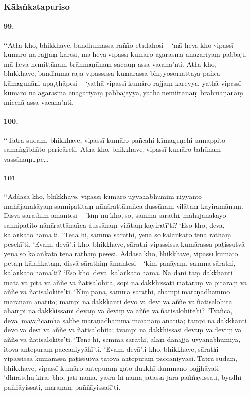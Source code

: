 \subsubsection{Kālaṅkatapuriso}

\paragraph{99.} ‘‘Atha kho, bhikkhave, bandhumassa rañño etadahosi – ‘mā heva kho vipassī kumāro na rajjaṃ kāresi, mā heva vipassī kumāro agārasmā anagāriyaṃ pabbaji, mā heva nemittānaṃ brāhmaṇānaṃ saccaṃ assa vacana’nti. Atha kho, bhikkhave, bandhumā rājā vipassissa kumārassa bhiyyosomattāya pañca kāmaguṇāni upaṭṭhāpesi – ‘yathā vipassī kumāro rajjaṃ kareyya, yathā vipassī kumāro na agārasmā anagāriyaṃ pabbajeyya, yathā nemittānaṃ brāhmaṇānaṃ micchā assa vacana’nti.

\paragraph{100.} ‘‘Tatra sudaṃ, bhikkhave, vipassī kumāro pañcahi kāmaguṇehi samappito samaṅgībhūto paricāreti. Atha kho, bhikkhave, vipassī kumāro bahūnaṃ vassānaṃ…pe…

\paragraph{101.} ‘‘Addasā kho, bhikkhave, vipassī kumāro uyyānabhūmiṃ niyyanto mahājanakāyaṃ sannipatitaṃ nānārattānañca dussānaṃ vilātaṃ kayiramānaṃ. Disvā sārathiṃ āmantesi – ‘kiṃ nu kho, so, samma sārathi, mahājanakāyo sannipatito nānārattānañca dussānaṃ vilātaṃ kayiratī’ti? ‘Eso kho, deva, kālaṅkato nāmā’ti. ‘Tena hi, samma sārathi, yena so kālaṅkato tena rathaṃ pesehī’ti. ‘Evaṃ, devā’ti kho, bhikkhave, sārathi vipassissa kumārassa paṭissutvā yena so kālaṅkato tena rathaṃ pesesi. Addasā kho, bhikkhave, vipassī kumāro petaṃ kālaṅkataṃ, disvā sārathiṃ āmantesi – ‘kiṃ panāyaṃ, samma sārathi, kālaṅkato nāmā’ti? ‘Eso kho, deva, kālaṅkato nāma. Na dāni taṃ dakkhanti mātā vā pitā vā aññe vā ñātisālohitā, sopi na dakkhissati mātaraṃ vā pitaraṃ vā aññe vā ñātisālohite’ti. ‘Kiṃ pana, samma sārathi, ahampi maraṇadhammo maraṇaṃ anatīto; mampi na dakkhanti devo vā devī vā aññe vā ñātisālohitā; ahampi na dakkhissāmi devaṃ vā deviṃ vā aññe vā ñātisālohite’ti? ‘Tvañca, deva, mayañcamha sabbe maraṇadhammā maraṇaṃ anatītā; tampi na dakkhanti devo vā devī vā aññe vā ñātisālohitā; tvampi na dakkhissasi devaṃ vā deviṃ vā aññe vā ñātisālohite’ti. ‘Tena hi, samma sārathi, alaṃ dānajja uyyānabhūmiyā, itova antepuraṃ paccaniyyāhī’ti. ‘Evaṃ, devā’ti kho, bhikkhave, sārathi vipassissa kumārassa paṭissutvā tatova antepuraṃ paccaniyyāsi. Tatra sudaṃ, bhikkhave, vipassī kumāro antepuraṃ gato dukkhī dummano pajjhāyati – ‘dhiratthu kira, bho, jāti nāma, yatra hi nāma jātassa jarā paññāyissati, byādhi paññāyissati, maraṇaṃ paññāyissatī’ti.

